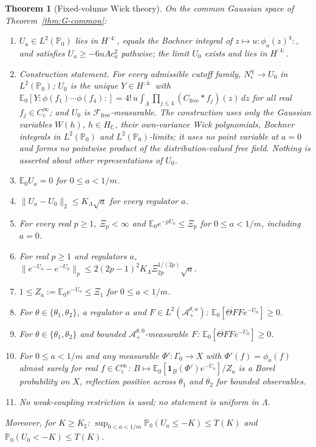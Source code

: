 \documentclass[11pt]{article}
\theoremstyle{plain}
\newtheorem{theorem}{Theorem}[section]
\theoremstyle{definition}
\theoremstyle{remark}
\newcommand{\C}{\mathbb{C}}
\newcommand{\E}{\mathbb{E}}
\newcommand{\PP}{\mathbb{P}}
\newcommand{\cF}{\mathcal{F}}
\newcommand{\cA}{\mathcal{A}}
\newcommand{\ind}{\mathbf{1}}
\newcommand{\Cfree}{C_{\mathrm{free}}}
\newcommand{\conj}[1]{\overline{#1}}
\begin{document}
\begin{theorem}[Fixed-volume Wick theory]\label{thm:W}
On the common Gaussian space of Theorem~\ref{thm:G-common}:
\begin{enumerate}[label=(\alph*)]
\item $U_a\in L^{2}(\PP_0)$ lies in $H^{{:}4{:}}$, equals the Bochner integral of
  $z\mapsto u{:}\phi_a(z)^{4}{:}$, and satisfies $U_a\ge-6uAc_a^{2}$ pathwise; the limit
  $U_0$ exists and lies in $H^{{:}4{:}}$.
\item \emph{Construction statement.} For every admissible cutoff family,
  $N^{\chi}_\epsilon\to U_0$ in $L^{2}(\PP_0)$; $U_0$ is the unique $Y\in H^{{:}4{:}}$ with
  $\E_0[Y{:}\phi(f_1)\cdots\phi(f_4){:}]=4!\,u\int_\Lambda\prod_{j\le4}(\Cfree*f_j)(z)\,dz$ for
  all real $f_j\in C_c^{\infty}$; and $U_0$ is $\cF_{\mathrm{free}}$-measurable. The
  construction uses only the Gaussian variables $W(h)$, $h\in H_{\C}$, their
  own-variance Wick polynomials, Bochner integrals in $L^{2}(\PP_0)$ and
  $L^{2}(\PP_0)$-limits; it uses no point variable at $a=0$ and forms no pointwise
  product of the distribution-valued free field. Nothing is asserted about other
  representations of $U_0$.
\item $\E_0U_a=0$ for $0\le a<1/m$.
\item $\|U_a-U_0\|_2\le K_\Lambda\sqrt a$ for every regulator $a$.
\item For every real $p\ge1$, $\Xi_p<\infty$ and $\E_0e^{-pU_a}\le\Xi_p$ for $0\le a<1/m$,
  including $a=0$.
\item For real $p\ge1$ and regulators $a$,
  $\|e^{-U_a}-e^{-U_0}\|_p\le2(2p-1)^{2}K_\Lambda\Xi_{2p}^{1/(2p)}\sqrt a$.
\item $1\le Z_a:=\E_0e^{-U_a}\le\Xi_1$ for $0\le a<1/m$.
\item For $\theta\in\{\theta_1,\theta_2\}$, a regulator $a$ and $F\in L^{2}(\cA^{\theta,a}_{+})$:
  $\E_0[\conj{\Theta F}Fe^{-U_a}]\ge0$.
\item For $\theta\in\{\theta_1,\theta_2\}$ and bounded $\cA^{\theta,0}_{+}$-measurable $F$:
  $\E_0[\conj{\Theta F}Fe^{-U_0}]\ge0$.
\item For $0\le a<1/m$ and any measurable $\Phi':\Gamma_0\to X$ with $\Phi'(f)=\phi_a(f)$
  almost surely for real $f\in C_c^{\infty}$: $B\mapsto\E_0[\ind_B(\Phi')e^{-U_a}]/Z_a$ is
  a Borel probability on $X$, reflection positive across $\theta_1$ and $\theta_2$
  for bounded observables.
\item No weak-coupling restriction is used; no statement is uniform in $\Lambda$.
\end{enumerate}
Moreover, for $K\ge K_\sharp$: $\sup_{0<a<1/m}\PP_0(U_a\le-K)\le T(K)$ and
$\PP_0(U_0<-K)\le T(K)$.
\end{theorem}
\end{document}
